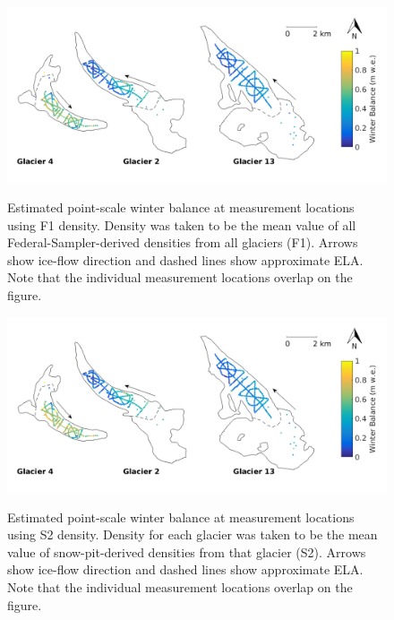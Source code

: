 \documentclass{sfuthesis}
\begin{document}
\begin{figure}[H]
	\centering
	\includegraphics[width = \textwidth]{SWEmap_opt3.png}\\
	\caption[Estimated point-scale winter balance at measurement locations using F1 density]{Estimated point-scale winter balance at measurement locations using F1 density. Density was taken to be the mean value of all Federal-Sampler-derived densities from all glaciers (F1). Arrows show ice-flow direction and dashed lines show approximate ELA. Note that the individual measurement locations overlap on the figure.}
	\label{fig:SWEmap_F1}
\end{figure}

\begin{figure}[H]
	\centering
	\includegraphics[width =\textwidth]{SWEmap_opt4.png}\\
	\caption[Estimated point-scale winter balance at measurement locations using S2 density]{Estimated point-scale winter balance at measurement locations using S2 density. Density for each glacier was taken to be the mean value of snow-pit-derived densities from that glacier (S2). Arrows show ice-flow direction and dashed lines show approximate ELA. Note that the individual measurement locations overlap on the figure.}
	\label{fig:SWEmap_S2}
\end{figure}
\end{document}
